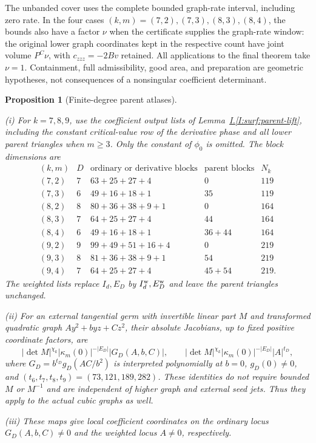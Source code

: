 \documentclass[11pt]{amsart}
\newtheorem{proposition}[theorem]{Proposition}
\theoremstyle{definition}
\theoremstyle{remark}
\numberwithin{equation}{section}
\newcommand{\partIref}[1]{\hyperref[I:#1]{I.\ref*{I:#1}}}
\begin{document}
The unbanded cover uses the complete bounded graph-rate interval, including zero rate. In the four cases $(k,m)=(7,2),(7,3),(8,3),(8,4)$, the bounds also have a factor $\nu$ when the certificate supplies the graph-rate window: the original lower graph coordinates kept in the respective count have joint volume $P^C\nu$, with $c_{zzz}=-2Bv$ retained. All applications to the final theorem take $\nu=1$. Containment, full admissibility, good area, and preparation are geometric hypotheses, not consequences of a nonsingular coefficient determinant.

\begin{proposition}[Finite-degree parent atlases]\label{surf:finite-null-atlases}\label{low:78:s37i:atlas}\label{low:78:s38o:atlas}\label{low:78:s38i:atlas}\label{low:78:d8q:atlas}\label{low:9:h9d:atlases}

\noindent\textup{(i)} For $k=7,8,9$, use the coefficient output lists of Lemma~\partIref{surf:parent-lift}, including the constant critical-value row of the derivative phase and all lower parent triangles when $m\ge3$. Only the constant of $\phi_0$ is omitted. The block dimensions are
\[
\begin{array}{c|c|c|c|c}
(k,m)&D&\text{ordinary or derivative blocks}&\text{parent blocks}&N_k\\\hline
(7,2)&7&63+25+27+4&0&119\\
(7,3)&6&49+16+18+1&35&119\\
(8,2)&8&80+36+38+9+1&0&164\\
(8,3)&7&64+25+27+4&44&164\\
(8,4)&6&49+16+18+1&36+44&164\\
(9,2)&9&99+49+51+16+4&0&219\\
(9,3)&8&81+36+38+9+1&54&219\\
(9,4)&7&64+25+27+4&45+54&219.
\end{array}
\]
The weighted lists replace $I_d,E_D$ by $I_d^{\rm w},E_D^{\rm w}$ and leave the parent triangles unchanged.

\noindent\textup{(ii)} For an external tangential germ with invertible linear part $M$ and transformed quadratic graph $Ay^2+byz+Cz^2$, their absolute Jacobians, up to fixed positive coordinate factors, are
\[
|\det M|^{\chi_k}|\kappa_m(0)|^{-|E_D|}|G_D(A,b,C)|,
\qquad |\det M|^{\chi_k}|\kappa_m(0)|^{-|E_D|}|A|^{t_D},
\]
where $G_D=b^{t_D}g_D(AC/b^2)$ is interpreted polynomially at $b=0$, $g_D(0)\ne0$, and $(t_6,t_7,t_8,t_9)=(73,121,189,282)$. These identities do not require bounded $M$ or $M^{-1}$ and are independent of higher graph and external seed jets. Thus they apply to the actual cubic graphs as well.

\noindent\textup{(iii)} These maps give local coefficient coordinates on the ordinary locus $G_D(A,b,C)\ne0$ and the weighted locus $A\ne0$, respectively.
\end{proposition}
\end{document}
